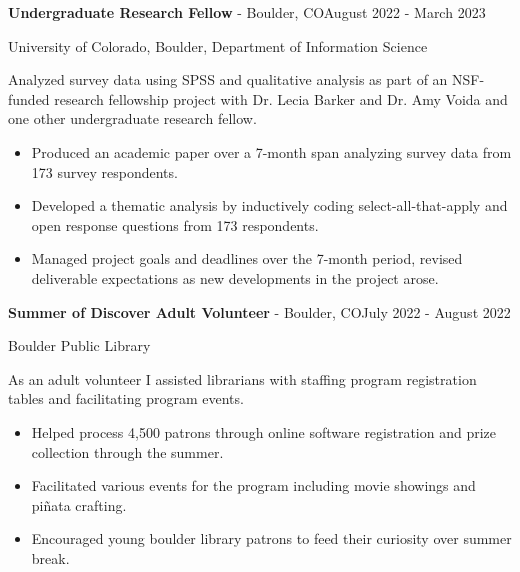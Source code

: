 \documentclass{article}
\newcommand{\itemSectionSpace}{\vspace{0.2in}}
\begin{document}
\begin{minipage}[t]{0.125\linewidth}
\uppercase{}
\end{minipage}%
\hfill
\begin{minipage}[t]{0.85\linewidth}
\textbf{Undergraduate Research Fellow} - Boulder, CO\hfill August 2022 - March 2023

University of Colorado, Boulder, Department of Information Science


Analyzed survey data using SPSS and qualitative analysis as part of an NSF-funded research fellowship project with Dr. Lecia Barker and Dr. Amy Voida and one other undergraduate research fellow.
\begin{itemize}[noitemsep,topsep=0pt]
   \item Produced an academic paper over a 7-month span analyzing survey data from 173 survey respondents.
   \item Developed a thematic analysis by inductively coding select-all-that-apply and open response questions from 173 respondents.
   \item Managed project goals and deadlines over the 7-month period, revised deliverable expectations as new developments in the project arose.
 \end{itemize}
\end{minipage}

\itemSectionSpace

\begin{minipage}[t]{0.125\linewidth}
\uppercase{}
\end{minipage}%
\hfill
\begin{minipage}[t]{0.85\linewidth}
\textbf{Summer of Discover Adult Volunteer} - Boulder, CO\hfill July 2022 - August 2022

Boulder Public Library


As an adult volunteer I assisted librarians with staffing program registration tables and facilitating program events.
\begin{itemize}[noitemsep,topsep=0pt]
   \item Helped process 4,500 patrons through online software registration and prize collection through the summer.
   \item Facilitated various events for the program including movie showings and piñata crafting.
   \item Encouraged young boulder library patrons to feed their curiosity over summer break.
 \end{itemize}
\end{minipage}
\end{document}
